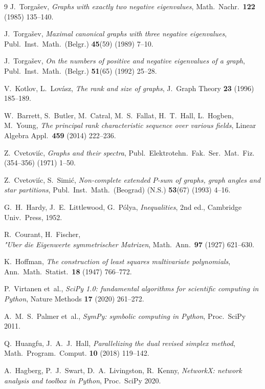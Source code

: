 \documentclass[11pt,a4paper]{article}
\theoremstyle{plain}
\theoremstyle{definition}
\begin{document}
\begin{thebibliography}{9}
J.~Torga{\v{s}}ev, \emph{Graphs with exactly two negative eigenvalues}, Math.\ Nachr.\
\textbf{122} (1985) 135--140.

J.~Torga{\v{s}}ev, \emph{Maximal canonical graphs with three negative eigenvalues},
Publ.\ Inst.\ Math.\ (Belgr.) \textbf{45}(59) (1989) 7--10.

J.~Torga{\v{s}}ev, \emph{On the numbers of positive and negative eigenvalues of a graph},
Publ.\ Inst.\ Math.\ (Belgr.) \textbf{51}(65) (1992) 25--28.

V.~Kotlov, L.~Lov\'asz, \emph{The rank and size of graphs}, J.\ Graph Theory \textbf{23}
(1996) 185--189.

W.~Barrett, S.~Butler, M.~Catral, M.~S.~Fallat, H.~T.~Hall, L.~Hogben, M.~Young,
\emph{The principal rank characteristic sequence over various fields}, Linear Algebra
Appl.\ \textbf{459} (2014) 222--236.

Z.~Cvetovi\'ic, \emph{Graphs and their spectra}, Publ.\ Elektrotehn.\ Fak.\ Ser.\ Mat.\
Fiz. (354--356) (1971) 1--50.

Z.~Cvetovi\'ic, S.~Simi\'c, \emph{Non-complete extended $P$-sum of graphs, graph angles
and star partitions}, Publ.\ Inst.\ Math.\ (Beograd) (N.S.) \textbf{53}(67) (1993)
4--16.

G.~H.~Hardy, J.~E.~Littlewood, G.~P\'olya, \emph{Inequalities}, 2nd ed., Cambridge
Univ.\ Press, 1952.

R.~Courant, H.~Fischer, \emph{\\"Uber die Eigenwerte symmetrischer Matrizen}, Math.\ Ann.\
\textbf{97} (1927) 621--630.

\bibitem[Hoffman]{Hoffman1947}
K.~Hoffman, \emph{The construction of least squares multivariate polynomials}, Ann.\ Math.\
Statist.\ \textbf{18} (1947) 766--772.

\bibitem[SciPy]{SciPy2020}
P.~Virtanen et~al., \emph{SciPy 1.0: fundamental algorithms for scientific computing in
Python}, Nature Methods \textbf{17} (2020) 261--272.

\bibitem[SymPy]{SymPy2011}
A.~M.~S.~Palmer et~al., \emph{SymPy: symbolic computing in Python}, Proc.\ SciPy 2011.

Q.~Huangfu, J.~A.~J.~Hall, \emph{Parallelizing the dual revised simplex method}, Math.\
Program.\ Comput. \textbf{10} (2018) 119--142.

A.~Hagberg, P.~J.~Swart, D.~A.~Livingston, R.~Kenny, \emph{NetworkX: network analysis and
toolbox in Python}, Proc.\ SciPy 2020.

\end{thebibliography}
\end{document}
